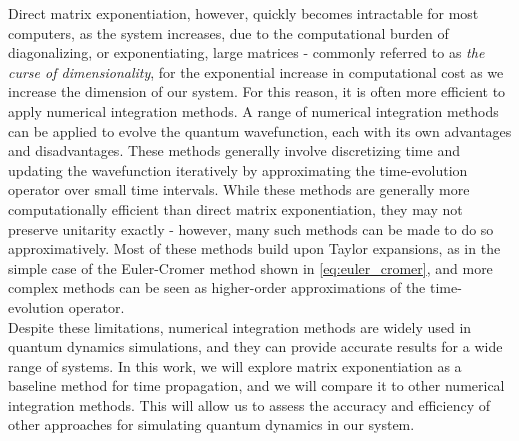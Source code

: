 \documentclass{subfiles}
\begin{document}
Direct matrix exponentiation, however, quickly becomes intractable for most computers, as the system increases, due to the computational burden of diagonalizing, or exponentiating, large matrices - commonly referred to as \emph{the curse of dimensionality}, for the exponential increase in computational cost as we increase the dimension of our system. For this reason, it is often more efficient to apply numerical integration methods. A range of numerical integration methods can be applied to evolve the quantum wavefunction, each with its own advantages and disadvantages. These methods generally involve discretizing time and updating the wavefunction iteratively by approximating the time-evolution operator over small time intervals. While these methods are generally more computationally efficient than direct matrix exponentiation, they may not preserve unitarity exactly - however, many such methods can be made to do so approximatively. Most of these methods build upon Taylor expansions, as in the simple case of the Euler-Cromer method shown in \eqref{eq:euler_cromer}, and more complex methods can be seen as higher-order approximations of the time-evolution operator. 
\\

Despite these limitations, numerical integration methods are widely used in quantum dynamics simulations, and they can provide accurate results for a wide range of systems. In this work, we will explore matrix exponentiation as a baseline method for time propagation, and we will compare it to other numerical integration methods. This will allow us to assess the accuracy and efficiency of other approaches for simulating quantum dynamics in our system. 
\\
\end{document}
